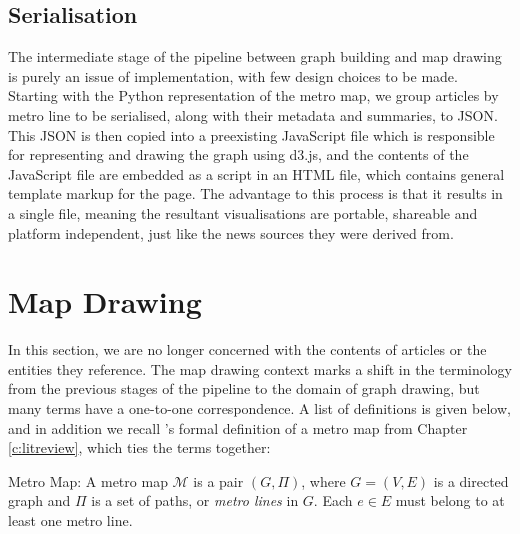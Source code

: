 \subsection{Serialisation}
The intermediate stage of the pipeline between graph building and map drawing is purely an issue of implementation, with few design choices to be made. Starting with the Python representation of the metro map, we group articles by metro line to be serialised, along with their metadata and summaries, to JSON. This JSON is then copied into a preexisting JavaScript file which is responsible for representing and drawing the graph using d3.js, and the contents of the JavaScript file are embedded as a script in an HTML file, which contains general template markup for the page. The advantage to this process is that it results in a single file, meaning the resultant visualisations are portable, shareable and platform independent, just like the news sources they were derived from.

\clearpage
\section{Map Drawing}

In this section, we are no longer concerned with the contents of articles or the entities they reference. The map drawing context marks a shift in the terminology from the previous stages of the pipeline to the domain of graph drawing, but many terms have a one-to-one correspondence. A list of definitions is given below, and in addition we recall \citeauthor{GeneratingInformationMaps}'s formal definition of a metro map from Chapter \ref{c:litreview}, which ties the terms together:

\addtocounter{definition}{-1}
\begin{definition}{Metro Map:}
A metro map $\mathcal{M}$ is a pair $(G, \Pi)$, where $G=(V, E)$ is a directed graph and $\Pi$ is a set of paths, or \textit{metro lines} in $G$. Each $e \in E$ must belong to at least one metro line.
\end{definition}

